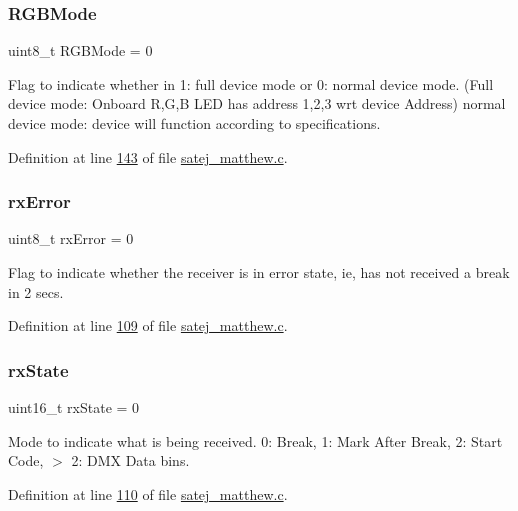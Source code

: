 \subsubsection{\texorpdfstring{RGBMode}{RGBMode}}
{\footnotesize\ttfamily uint8\+\_\+t R\+G\+B\+Mode = 0}

Flag to indicate whether in 1\+: full device mode or 0\+: normal device mode. (Full device mode\+: Onboard R,G,B L\+ED has address 1,2,3 wrt device Address) normal device mode\+: device will function according to specifications. 

Definition at line \mbox{\hyperlink{satej__matthew_8c_source_l00143}{143}} of file \mbox{\hyperlink{satej__matthew_8c_source}{satej\+\_\+matthew.\+c}}.

\mbox{\label{satej__matthew_8c_a3b602f53c4c8ee9c5b185230f0ed4e2e}} 
\subsubsection{\texorpdfstring{rxError}{rxError}}
{\footnotesize\ttfamily uint8\+\_\+t rx\+Error = 0}

Flag to indicate whether the receiver is in error state, ie, has not received a break in 2 secs. 

Definition at line \mbox{\hyperlink{satej__matthew_8c_source_l00109}{109}} of file \mbox{\hyperlink{satej__matthew_8c_source}{satej\+\_\+matthew.\+c}}.

\mbox{\label{satej__matthew_8c_a1270408cd1dbd2e41859adf94cb71e5d}} 
\subsubsection{\texorpdfstring{rxState}{rxState}}
{\footnotesize\ttfamily uint16\+\_\+t rx\+State = 0}

Mode to indicate what is being received. 0\+: Break, 1\+: Mark After Break, 2\+: Start Code, $>$ 2\+: D\+MX Data bins. 

Definition at line \mbox{\hyperlink{satej__matthew_8c_source_l00110}{110}} of file \mbox{\hyperlink{satej__matthew_8c_source}{satej\+\_\+matthew.\+c}}.

\mbox{\label{satej__matthew_8c_a70fc306096de2bed127c1afdc92bd30d}} 
